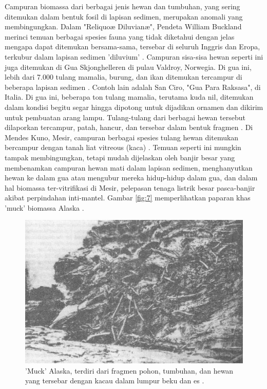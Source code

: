 \documentclass[10pt,twocolumn,letterpaper]{article}
\begin{document}
Campuran biomassa dari berbagai jenis hewan dan tumbuhan, yang sering ditemukan dalam bentuk fosil di lapisan sedimen, merupakan anomali yang membingungkan. Dalam "Reliquoæ Diluvianæ", Pendeta William Buckland merinci temuan berbagai spesies fauna yang tidak diketahui dengan jelas mengapa dapat ditemukan bersama-sama, tersebar di seluruh Inggris dan Eropa, terkubur dalam lapisan sedimen 'diluvium' \cite{58}. Campuran sisa-sisa hewan seperti ini juga ditemukan di Gua Skjonghelleren di pulau Valdroy, Norwegia. Di gua ini, lebih dari 7.000 tulang mamalia, burung, dan ikan ditemukan tercampur di beberapa lapisan sedimen \cite{59}. Contoh lain adalah San Ciro, "Gua Para Raksasa", di Italia. Di gua ini, beberapa ton tulang mamalia, terutama kuda nil, ditemukan dalam kondisi begitu segar hingga dipotong untuk dijadikan ornamen dan dikirim untuk pembuatan arang lampu. Tulang-tulang dari berbagai hewan tersebut dilaporkan tercampur, patah, hancur, dan tersebar dalam bentuk fragmen \cite{60,61}. Di Mendes Kuno, Mesir, campuran berbagai spesies tulang hewan ditemukan bercampur dengan tanah liat vitreous (kaca) \cite{57}. Temuan seperti ini mungkin tampak membingungkan, tetapi mudah dijelaskan oleh banjir besar yang membenamkan campuran hewan mati dalam lapisan sedimen, menghanyutkan hewan ke dalam gua atau mengubur mereka hidup-hidup dalam gua, dan dalam hal biomassa ter-vitrifikasi di Mesir, pelepasan tenaga listrik besar pasca-banjir akibat perpindahan inti-mantel. Gambar \ref{fig:7} memperlihatkan paparan khas 'muck' biomassa Alaska \cite{56}.

\begin{figure}[t]
\begin{center}
   \includegraphics[width=1\linewidth]{muck-crop.jpeg}
\end{center}
   \caption{'Muck' Alaska, terdiri dari fragmen pohon, tumbuhan, dan hewan yang tersebar dengan kacau dalam lumpur beku dan es \cite{146}.}
\label{fig:7}
\label{fig:onecol}
\end{figure}
\end{document}

